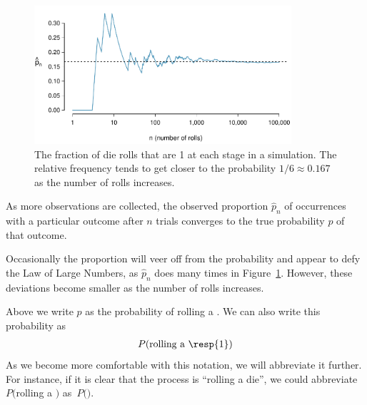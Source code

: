 \begin{figure}[ht]
\centering
\includegraphics[width=0.85\textwidth]{ch_probability/figures/dieProp/dieProp}
\caption{The fraction of die rolls that are 1 at each stage in a simulation. The relative frequency tends to get closer to the probability $1/6 \approx 0.167$ as the number of rolls increases.}
\label{dieProp}
\end{figure}

\begin{termBox}{
As more observations are collected, the observed proportion $\hat{p}_n$ of occurrences with a particular outcome after $n$ trials converges to the true probability $p$ of that outcome.}
\end{termBox}

Occasionally the proportion will veer off from the probability and appear to defy the Law of Large Numbers, as $\hat{p}_n$ does many times in Figure~\ref{dieProp}. However, these deviations become smaller as the number of rolls increases.

Above we write $p$ as the probability of rolling a . We can also write this probability as
\begin{eqnarray*}
P(\text{rolling a \resp{1}})
\end{eqnarray*}
As we become more comfortable with this notation, we will abbreviate it further. For instance, if it is clear that the process is ``rolling a die'', we could abbreviate $P($rolling a $)$ as~$P($$)$.

